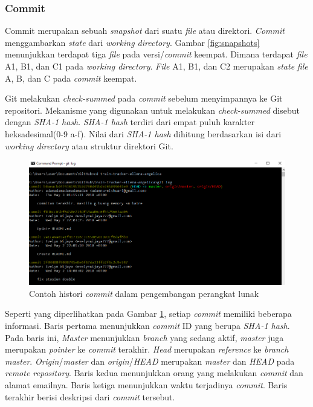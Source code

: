\subsubsection{Commit}
Commit merupakan sebuah \textit{snapshot} dari suatu \textit{file} atau direktori. \textit{Commit} menggambarkan \textit{state} dari \textit{working directory}. Gambar \ref{fig:snapshots} menunjukkan terdapat tiga \textit{file} pada versi/\textit{commit} keempat. Dimana terdapat \textit{file} A1, B1, dan C1 pada \textit{working directory}. \textit{File} A1, B1, dan C2  merupakan \textit{state} \textit{file} A, B, dan C pada \textit{commit} keempat. 

Git melakukan \textit{check-summed} pada \textit{commit} sebelum menyimpannya ke Git repositori. Mekanisme yang digunakan untuk melakukan \textit{check-summed} disebut dengan \textit{SHA-1 hash}\cite{chacon2014pro}. \textit{SHA-1 hash} terdiri dari empat puluh karakter heksadesimal(0-9 a-f). Nilai dari \textit{SHA-1 hash} dihitung berdasarkan isi dari \textit{working directory} atau struktur direktori Git.

\begin{figure}[H]
	\centering
		\includegraphics[scale=0.6]{Gambar/contoh_commit_history.png}
	\caption{Contoh histori \textit{commit} dalam pengembangan perangkat lunak}
	\label{fig:git_histori}
\end{figure}

Seperti yang diperlihatkan pada Gambar \ref{fig:git_histori}, setiap \textit{commit} memiliki beberapa informasi. Baris pertama menunjukkan \textit{commit} ID yang berupa \textit{SHA-1 hash}. Pada baris ini, \textit{Master} menunjukkan \textit{branch} yang sedang aktif, \textit{master} juga merupakan \textit{pointer} ke \textit{commit} terakhir. \textit{Head} merupakan \textit{reference} ke \textit{branch master}. \textit{Origin}/\textit{master} dan \textit{origin}/\textit{HEAD} merupakan \textit{master} dan \textit{HEAD} pada \textit{remote repository}. Baris kedua menunjukkan orang yang melakukan \textit{commit} dan alamat emailnya. Baris ketiga menunjukkan waktu terjadinya \textit{commit}. Baris terakhir berisi deskripsi dari \textit{commit} tersebut.

